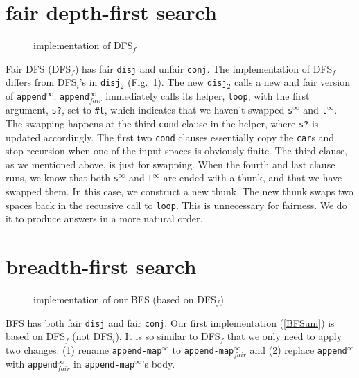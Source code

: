 \documentclass[format=acmlarge, review=true, authordraft=true]{acmart}
\newcommand{\conj}{\texttt{conj}}
\newcommand{\disj}{\texttt{disj}}
\newcommand{\disjtwo}{\texttt{disj$_2$}}
\newcommand{\DFSi }[0]{DFS$_{i}$}
\newcommand{\DFSf }[0]{DFS$_{f}$}
\newcommand{\BFS}[0]{BFS}
\newcommand{\BFSuni}[0]{our BFS}
\begin{document}
\section{fair depth-first search}

\begin{figure}
	
	\caption{implementation of \DFSf{}}
	\label{fDFS}
\end{figure}

Fair DFS (\DFSf) has fair \disj{} and unfair \conj{}. The 
implementation of \DFSf{} differs from \DFSi{}'s in 
\disjtwo{} (Fig.~\ref{fDFS}). The new \disjtwo{} calls a new and 
fair version of \texttt{append$^\infty$}. \texttt{append$^\infty_{fair}$} 
immediately 
calls 
its helper, \texttt{loop}, with the first argument, \texttt{s?}, set to 
\texttt{\#{}t}, which indicates that we haven't swapped
\texttt{s$^\infty$} and \texttt{t$^\infty$}. The swapping 
happens at 
the third \texttt{cond} clause in the helper, where \texttt{s?} is updated 
accordingly. The first two \texttt{cond} clauses essentially copy the 
\texttt{car}s and stop recursion when one of the input spaces is obviously 
finite. The third clause, as we mentioned above, is just for swapping. When the 
fourth and last clause runs, we know that both \texttt{s$^\infty$} and 
\texttt{t$^\infty$} are ended with a thunk, and that we have swapped them. In 
this case, we construct a new thunk. The new thunk swaps two spaces back in the
recursive call to \texttt{loop}. This is unnecessary for fairness. We do it to 
produce answers in a more natural order.


\section{breadth-first search}

\begin{figure}
		
	\caption{implementation of \BFSuni{} (based on \DFSf{})}
	\label{BFSuni}
\end{figure}

\BFS{} has both fair \disj{} and fair \conj{}. Our first implementation 
(\autoref{BFSuni}) is based on \DFSf{} (not \DFSi{}). It is so similar to 
\DFSf{} that we only need to apply two changes: (1) rename 
\texttt{append-map$^\infty$} to \texttt{append-map$^\infty_{fair}$} and (2) 
replace \texttt{append$^\infty$} with \texttt{append$^\infty_{fair}$} in 
\texttt{append-map$^\infty$}'s body. 
\end{document}
